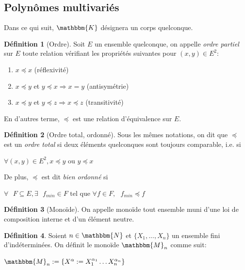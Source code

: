 \documentclass[12pt]{article}
\theoremstyle{remark}\newtheorem{note}{Note}
\theoremstyle{remark}\newtheorem{nota}{Notation}
\newcommand{\M}{\mathbbm{M}}
\newcommand{\N}{\mathbbm{N}}
\newcommand{\K}{\mathbbm{K}}
\newcommand{\ord}{\preccurlyeq}
\theoremstyle{definition}
\newtheorem{definition}{Définition}
\begin{document}
\subsection{Polynômes multivariés}



Dans ce qui suit, $\K$ désignera un corps quelconque.

\begin{definition}[Ordre]
Soit $E$ un ensemble quelconque, on appelle \textit{ordre partiel} sur $E$ toute relation vérifiant les propriétés suivantes pour $(x,y) \in E^2$:
	 \begin{enumerate}
	 	\item $x\ord x$ (réflexivité)
	 	\item $x\ord y$ et $y\ord x \Rightarrow x=y$ (antisymétrie)
	 	\item $x\ord y$ et $y\ord z \Rightarrow x\ord z$ (transitivité)
	 \end{enumerate}
En d'autres terme, $\ord$ est une relation d'équivalence sur $E$.
\end{definition}

\begin{definition}[Ordre total, ordonné]
Sous les mêmes notations, on dit que $\ord$ est un \textit{ordre total} si deux éléments quelconques sont toujours comparable, i.e. si
	\begin{center}$\forall (x,y)\in E^2, x\ord y\text{ ou } y\ord x$\end{center}
De plus, $\ord$ est dit \textit{bien ordonné} si
	\begin{center}$  \forall\text{ } F \subseteq E, \exists \text{ } f_{min}\in F \text{ tel que } \forall f\in F, \text{ } f_{min}\ord f $\end{center}
\end{definition}

\begin{definition}[Monoïde]
On appelle monoïde tout ensemble muni d'une loi de composition interne et d'un élément neutre.
\end{definition}

\begin{definition}
Soient $n\in\N$ et $\{X_1, ..., X_n\}$ un ensemble fini d'indéterminées. On définit le monoïde $\M_n$ comme suit:
	\begin{center} $\M_n := \{ X^{\alpha} := X_1^{\alpha_1}\ldots X_n^{\alpha_n}\}$ \end{center}
\end{definition}
\end{document}

